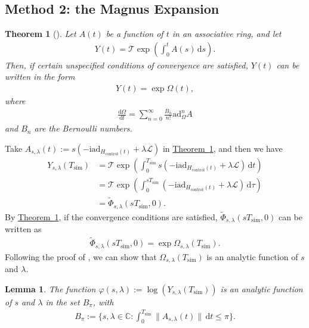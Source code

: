 \documentclass[11pt]{article}
\newtheorem{theorem}{Theorem}
\newtheorem{lemma}{Lemma}
\newcommand{\thm}[1]{\hyperref[thm:#1]{Theorem~\ref*{thm:#1}}}
\renewcommand{\i}{\mathrm{i}}
\renewcommand{\d}{\mathrm{d}}
\renewcommand{\L}{\mathcal{L}}
\newcommand{\ad}{\mathrm{ad}}
\newcommand{\T}{\mathcal{T}}
\newcommand{\simu}{\mathrm{sim}}
\newcommand{\Hc}{H_{\mathrm{control}}}
\begin{document}
\subsection{Method 2: the Magnus Expansion}
\begin{theorem}[{\cite[Theorem III]{magnus1954}}]
\label{thm:magnus-exp}
    Let $A(t)$ be a function of $t$ in an associative ring, and let \begin{align*}
        Y(t) = \T \exp(\int_{0}^{t} A(s)\,\d s).
    \end{align*}
    Then, if certain unspecified conditions of convergence are satisfied, $Y(t)$ can be written in the form \begin{align*}
        Y(t) = \exp \Omega(t),
    \end{align*}
    where 
    \begin{align*}
        \frac{\d \Omega}{\d t}=\sum_{n=0}^{\infty} \frac{B_n}{n!} \ad_{\Omega}^n A
    \end{align*}
    and $B_n$ are the Bernoulli numbers.
\end{theorem}
Take $A_{s,\lambda}(t) := s(-\i \ad_{\Hc(t)}+\lambda\L)$ in \thm{magnus-exp}, and then we have \begin{align}
    Y_{s,\lambda}(T_{\simu}) & = \T\exp(\int_{0}^{T_\simu} s(-\i \ad_{\Hc(t)}+\lambda\L)\,\d t)\\
    & = \T\exp(\int_{0}^{sT_\simu}(-\i \ad_{\Hc(t)}+\lambda\L)\,\d \tau) \\
    & =\tilde{\Phi}_{s,\lambda}(sT_{\simu}, 0).
\end{align}
By \thm{magnus-exp}, if the convergence conditions are satisfied, $\tilde{\Phi}_{s,\lambda}(sT_{\simu}, 0)$ can be written as \begin{align*}
    \tilde{\Phi}_{s,\lambda}(sT_{\simu}, 0) = \exp \Omega_{s,\lambda}(T_{\simu}).
\end{align*}
Following the proof of \cite[Theorem 6]{blanes2009magnus}, we can show that $\Omega_{s,\lambda}(T_{\simu})$ is an analytic function of $s$ and $\lambda$.
\begin{lemma}
    \label{lem:analytic-phi}
    The function $\varphi(s,\lambda):=\log(Y_{s,\lambda}(T_{\simu}))$ is an analytic function of $s$ and $\lambda$ in the set $B_{\pi}$, with \begin{align*}
        B_{\pi} :=\{s,\lambda \in \mathbb{C}: \int_{0}^{T_{\simu}}\|A_{s,\lambda}(t) \|\,\d t\le \pi \}.
    \end{align*}
\end{lemma}
 
\end{document}
